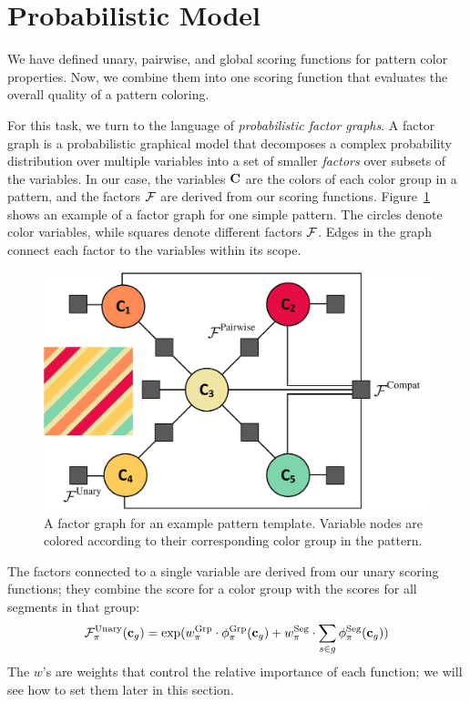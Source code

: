 \section{Probabilistic Model}
\label{sec:model}

We have defined unary, pairwise, and global scoring functions for pattern color properties. Now, we combine them into one scoring function that evaluates the overall quality of a pattern coloring.

For this task, we turn to the language of \emph{probabilistic factor graphs}. A factor graph is a probabilistic graphical model that decomposes a complex probability distribution over multiple variables into a set of smaller \emph{factors} over subsets of the variables. In our case, the variables $\mathbf{C}$ are the colors of each color group in a pattern, and the factors $\mathcal{F}$ are derived from our scoring functions. Figure~\ref{fig:FactorGraph} shows an example of a factor graph for one simple pattern. The circles denote color variables, while squares denote different factors $\mathcal{F}$. Edges in the graph connect each factor to the variables within its scope.

\begin{figure}[ht]
\centering
\includegraphics[width=0.8\columnwidth]{figs/factorGraphNew}
\caption{A factor graph for an example pattern template. Variable nodes are colored according to their corresponding color group in the pattern.}
\label{fig:FactorGraph}
\end{figure}

The factors connected to a single variable are derived from our unary scoring functions; they combine the score for a color group with the scores for all segments in that group:
\begin{equation*}
 \mathcal{F}^{\textrm{Unary}}_\pi(\mathbf{c}_g) =
 		\exp( w^{\textrm{Grp}}_\pi \cdot \phi^{\textrm{Grp}}_\pi(\mathbf{c}_g)  \\
 		     + w^{\textrm{Seg}}_\pi \cdot \sum_{s \in g} \phi^{\textrm{Seg}}_\pi(\mathbf{c}_g)) 
\end{equation*}
The $w$'s are weights that control the relative importance of each function; we will see how to set them later in this section.

